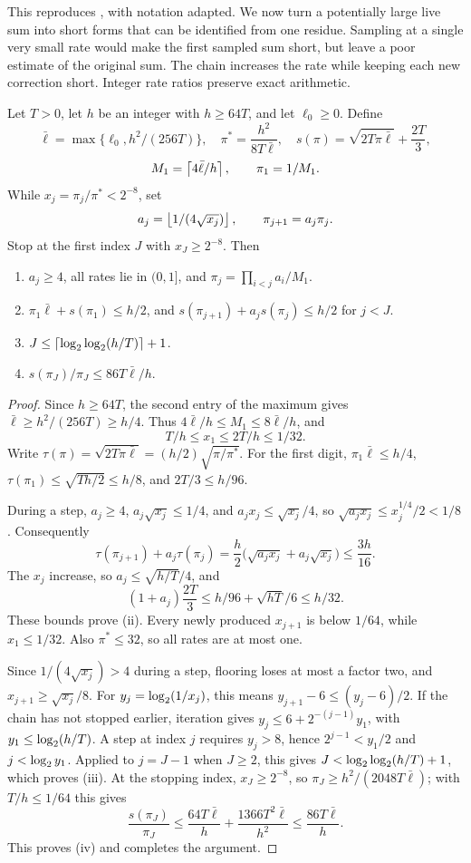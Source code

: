 This reproduces \cite[Section~5]{NagCG}, with notation adapted. We now turn a potentially large live sum into short forms that can
be identified from one residue. Sampling at a single very small rate
would make the first sampled sum short, but leave a poor estimate of
the original sum. The chain increases the rate while keeping each
new correction short. Integer rate ratios preserve exact arithmetic.

\begin{lemma}\label{earlier:g:lem:chain}
Let \(T>0\), let \(h\) be an integer with \(h\ge64T\), and let
\(\ell_0\ge0\). Define
\[
 \bar\ell=\max\{\ell_0,h^2/(256T)\},\quad
 \pi^*=\frac{h^2}{8T\bar\ell},\quad
 s(\pi)=\sqrt{2T\pi\bar\ell}+\frac{2T}{3},
\]
\[
 M_1=\left\lceil4\bar\ell/h\right\rceil,\qquad \pi_1=1/M_1.
\]
While \(x_j=\pi_j/\pi^*<2^{-8}\), set
\[
 a_j=\left\lfloor1/(4\sqrt{x_j})\right\rfloor,\qquad \pi_{j+1}=a_j\pi_j.
\]
Stop at the first index \(J\) with \(x_J\ge2^{-8}\). Then
\begin{enumerate}[label=(\roman*)]
\item \(a_j\ge4\), all rates lie in \((0,1]\), and
\(\pi_j=\prod_{i<j}a_i/M_1\).
\item \(\pi_1\bar\ell+s(\pi_1)\le h/2\), and
\(s(\pi_{j+1})+a_js(\pi_j)\le h/2\) for \(j<J\).
\item \(J\le\left\lceil\log_2\log_2(h/T)\right\rceil+1\).
\item \(s(\pi_J)/\pi_J\le86T\bar\ell/h\).
\end{enumerate}
\end{lemma}
\begin{proof}
Since \(h\ge64T\), the second entry of the maximum gives
\(\bar\ell\ge h^2/(256T)\ge h/4\).
Thus \(4\bar\ell/h\le M_1\le8\bar\ell/h\), and
\[
 T/h\le x_1\le2T/h\le1/32.
\]
Write \(\tau(\pi)=\sqrt{2T\pi\bar\ell}
=(h/2)\sqrt{\pi/\pi^*}\).
For the first digit,
\(\pi_1\bar\ell\le h/4\),
\(\tau(\pi_1)\le\sqrt{Th/2}\le h/8\), and \(2T/3\le h/96\).

During a step, \(a_j\ge4\),
\(a_j\sqrt{x_j}\le1/4\), and
\(a_jx_j\le\sqrt{x_j}/4\), so \(\sqrt{a_jx_j}\le x_j^{1/4}/2<1/8\). Consequently
\[
 \tau(\pi_{j+1})+a_j\tau(\pi_j)
 =\frac h2\bigl(\sqrt{a_jx_j}+a_j\sqrt{x_j}\bigr)
 \le\frac{3h}{16}.
\]
The \(x_j\) increase, so
\(a_j\le\sqrt{h/T}/4\), and
\[
 (1+a_j)\frac{2T}{3}
 \le h/96+\sqrt{hT}/6\le h/32.
\]
These bounds prove (ii).
Every newly produced \(x_{j+1}\) is below \(1/64\), while
\(x_1\le1/32\). Also \(\pi^*\le32\), so all rates are at most one.

Since \(1/(4\sqrt{x_j})>4\) during a step, flooring loses at most
a factor two, and
\(x_{j+1}\ge\sqrt{x_j}/8\).
For \(y_j=\log_2(1/x_j)\), this means
\(y_{j+1}-6\le(y_j-6)/2\).
If the chain has not stopped earlier, iteration gives
\(y_j\le6+2^{-(j-1)}y_1\), with
\(y_1\le\log_2(h/T)\). A step at index \(j\) requires \(y_j>8\), hence
\(2^{j-1}<y_1/2\) and \(j<\log_2 y_1\). Applied to \(j=J-1\) when
\(J\ge2\), this gives \(J<\log_2\log_2(h/T)+1\), which proves (iii).
At the stopping index, \(x_J\ge2^{-8}\), so
\(\pi_J\ge h^2/(2048T\bar\ell)\); with \(T/h\le1/64\) this gives
\[
 \frac{s(\pi_J)}{\pi_J}
 \le\frac{64T\bar\ell}{h}
       +\frac{1366T^2\bar\ell}{h^2}
 \le\frac{86T\bar\ell}{h}.
\]
This proves (iv) and completes the argument.
\end{proof}

